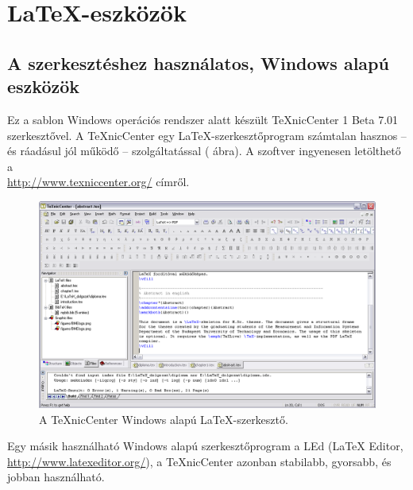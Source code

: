 \chapter{\LaTeX-eszközök}\label{sect:LatexTools}
\section{A szerkesztéshez használatos, Windows alapú eszközök}
Ez a sablon Windows operációs rendszer alatt készült TeXnicCenter 1 Beta 7.01 szerkesztővel. A TeXnicCenter egy \LaTeX-szerkesztőprogram számtalan hasznos -- és ráadásul jól működő -- szolgáltatással ( ábra). A szoftver ingyenesen letölthető a\\\url{http://www.texniccenter.org/} címről.

\begin{figure}[!ht]
\centering
\includegraphics[width=150mm, keepaspectratio]{figures/TeXnicCenter.png}
\caption{A TeXnicCenter Windows alapú \LaTeX-szerkesztő.} 
\label{fig:TexnicCenter}
\end{figure}

Egy másik használható Windows alapú szerkesztőprogram a LEd (LaTeX Editor,\\\url{http://www.latexeditor.org/}), a TeXnicCenter azonban stabilabb, gyorsabb, és jobban használható.

